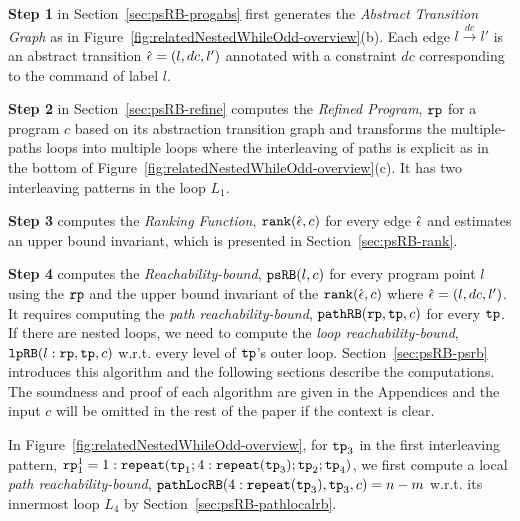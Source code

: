 
\textbf{Step 1}
in Section~\ref{sec:psRB-progabs} first 
generates the \emph{Abstract Transition Graph} as in Figure~\ref{fig:relatedNestedWhileOdd-overview}(b).
Each edge $l \xrightarrow{dc} l'$ is an abstract transition $\hat{\mathtt{\epsilon}{}} = (l, dc, l')$ annotated with a constraint $dc$ corresponding to the command of label $l$.

\textbf{Step 2} in Section~\ref{sec:psRB-refine}
computes the \emph{Refined Program}, $\mathtt{rp}$ for a program $c$ based on 
its abstraction transition graph and transforms the multiple-paths loops
into multiple loops where
the interleaving of paths is explicit as in the bottom of Figure~\ref{fig:relatedNestedWhileOdd-overview}(c).
It has two interleaving patterns in the loop $L_1$.

\textbf{Step 3} computes the \emph{Ranking Function}, $\mathtt{rank}(\hat{\mathtt{\epsilon}{}}, c)$
for every edge $\hat{\mathtt{\epsilon}{}}$ 
and estimates an upper bound invariant, which is presented in Section~\ref{sec:psRB-rank}.

\textbf{Step 4}
computes the \emph{Reachability-bound}, $\mathtt{psRB}(l, c)$ for every program point $l$ using the $\mathtt{rp}$ and the upper bound invariant of the $\mathtt{rank}(\hat{\mathtt{\epsilon}{}}, c)$ where $\hat{\mathtt{\epsilon}{}} = (l,dc,l')$.
{It requires computing the \emph{path reachability-bound}, $\mathtt{pathRB}(\mathtt{rp}, \mathtt{tp}, c)$ for every $\mathtt{tp}$.
If there are nested loops, we need to compute the \emph{loop reachability-bound}, $\mathtt{lpRB}(l: \mathtt{rp}, \mathtt{tp}, c)$ w.r.t. every level of $\mathtt{tp}$'s outer loop. }
Section~\ref{sec:psRB-psrb} introduces this algorithm and the following sections describe the computations. 
The soundness and proof of each algorithm are given in the Appendices and the input $c$ will be omitted in the rest of the paper if the context is clear.

In Figure~\ref{fig:relatedNestedWhileOdd-overview}, for $\mathtt{tp}_3$ in the first interleaving pattern, $\mathtt{rp}_1^1 = 1: \mathtt{repeat}(\mathtt{tp}_1; 4:\mathtt{repeat}(\mathtt{tp}_3); \mathtt{tp}_2; \mathtt{tp}_4)$, 
we first compute a local \emph{path reachability-bound}, $\mathtt{pathLocRB}(4:\mathtt{repeat}(\mathtt{tp}_3), \mathtt{tp}_3, c) = n - m$
w.r.t. its innermost loop $L_4$ by Section~\ref{sec:psRB-pathlocalrb}.

